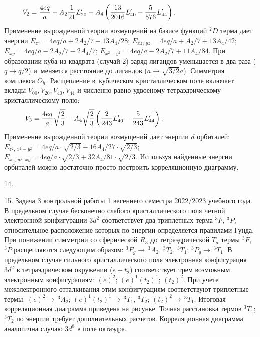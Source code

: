 \begin{equation*}
\begin{aligned}
& V_2= \dfrac{4eq}{a} - A_2 \dfrac{1}{21}L_{20}' - A_4 \left( \dfrac{13}{2016}L_{40}'  - \dfrac{5}{576}L_{44}' \right). \hspace{28mm}
\end{aligned}
\end{equation*}
Применение вырожденной теории возмущений на базисе функций $^2D$ терма дает энергии $E_{z^2} = 4eq/a + 2A_2/7 - {13A_4}/{28}$; $E_{xz,\, yz} = 4eq/a +{A_2}/{7} + {13A_4}/{42}$; $E_{xy} = 4eq/a - {2A_2}/{7} - {2A_4}/{7}$; $E_{x^2-y^2} = 4eq/a - {2A_2}/{7} + {11A_4}/{84}$. 
При образовании куба из квадрата (случай 2) заряд лигандов уменьшается в два раза ($q \rightarrow q/2$) и~меняется расстояние до лигандов ($a \rightarrow \sqrt{3/2}a$). Симметрия комплекса $O_h$. Расщепление в~кубическом кристаллическом поле включает вклады  $V_{00}, V_{20}, V_{40}, V_{44}$ и численно равно удвоеному тетраэдрическому кристаллическому полю:
\begin{equation*}
\begin{aligned}
& V_3= \dfrac{4eq}{a} \sqrt{\dfrac{2}{3}}  - A_4 \sqrt{\dfrac{2}{3}} \left( \dfrac{2}{243}L_{40}'  - \dfrac{5}{243}L_{44}' \right). \hspace{33mm}
\end{aligned}
\end{equation*}
Применение вырожденной теории возмущений дает энергии $d$ орбиталей: $E_{z^2,\,x^2-y^2} = 4eq/a \cdot \sqrt{2/3} -  16A_4/27 \cdot \sqrt{2/3} $; $E_{xz,\, yz,\,xy} =  4eq/a \cdot \sqrt{2/3} +  {32A_4}/{81} \cdot \sqrt{2/3}$. Используя найденные энергии орбиталей можно достаточно просто построить корреляционную диаграмму.\par
14. \par
15. Задача 3 контрольной работы 1 весеннего семестра 2022/2023 учебного года. В предельном случае бесконечно слабого кристаллического поля четной электронной конфигурации $3d^2$ соответствует два триплетных терма $^3F$, $^3P$, относительное расположение которых по энергии определяется правилами Гунда. При понижении симметрии со сферической $R_3$ до тетраэдрической $T_d$ термы $^3F$, $^3P$ расщепляются следующим образом: $^3F_g \rightarrow \,^3A_2,\,^3T_2,\,^3T_1$; $^3P_g  \rightarrow\,^3T_1$. В предельном случае сильного кристаллического поля электронная конфигурация $3d^2$ в тетраэдрическом окружении ($e + t_2$) соответствует трем возможным электронным конфигурациям: $(e)^2$; $(e)^1(t_2 )^1$; $(t_2 )^2$. При учете межэлектронного отталкивания этим конфигурациям соответствуют триплетные термы: $(e)^2  \rightarrow \,^3A_2$;  $(e)^1 (t_2 )^1  \rightarrow \,^3T_1,\,^3T_2$; $(t_2 )^2  \rightarrow \,^3T_1$. Итоговая корреляционная диаграмма приведена на рисунке. Точная расстановка термов $^3T_1$; $^3T_2$ по энергии требует дополнительных расчетов. Корреляционная диаграмма аналогична случаю $3d^8$ в поле октаэдра.\par
\newpage


